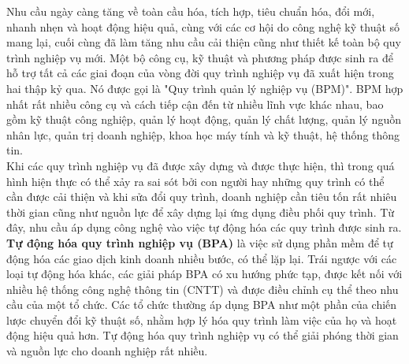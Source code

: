 Nhu cầu ngày càng tăng về toàn cầu hóa, tích hợp, tiêu chuẩn hóa, đổi mới, nhanh nhẹn và hoạt động hiệu quả, cùng với các cơ hội do công nghệ kỹ thuật số mang lại, cuối cùng đã làm tăng nhu cầu cải thiện  cũng như thiết kế toàn bộ quy trình nghiệp vụ mới. Một bộ công cụ, kỹ thuật và phương pháp được sinh ra để hỗ trợ tất cả các giai đoạn của vòng đời quy trình nghiệp vụ đã xuất hiện trong hai thập kỷ qua. Nó được gọi là "Quy trình quản lý nghiệp vụ (BPM)". BPM hợp nhất rất nhiều công cụ và cách tiếp cận đến từ nhiều lĩnh vực khác nhau, bao gồm kỹ thuật công nghiệp, quản lý hoạt động, quản lý chất lượng, quản lý nguồn nhân lực, quản trị doanh nghiệp, khoa học máy tính và kỹ thuật, hệ thống thông tin.\\

Khi các quy trình nghiệp vụ đã được xây dựng và được thực hiện, thì trong quá hình hiện thực có thể xảy ra sai sót bởi con người hay những quy trình có thể cần được cải thiện và khi sửa đổi quy trình, doanh nghiệp cần tiêu tốn rất nhiêu thời gian cũng như nguồn lực để xây dựng lại ứng dụng điều phối quy trình. Từ đây, nhu cầu áp dụng công nghệ vào việc tự động hóa các quy trình được sinh ra. \textbf{Tự động hóa quy trình nghiệp vụ (BPA)} là việc sử dụng phần mềm để tự động hóa các giao dịch kinh doanh nhiều bước, có thể lặp lại. Trái ngược với các loại tự động hóa khác, các giải pháp BPA có xu hướng phức tạp, được kết nối với nhiều hệ thống công nghệ thông tin (CNTT) và được điều chỉnh cụ thể theo nhu cầu của một tổ chức. Các tổ chức thường áp dụng BPA như một phần của chiến lược chuyển đổi kỹ thuật số, nhằm hợp lý hóa quy trình làm việc của họ và hoạt động hiệu quả hơn. Tự động hóa quy trình nghiệp vụ có thể giải phóng thời gian và nguồn lực cho doanh nghiệp rất nhiều.\\

